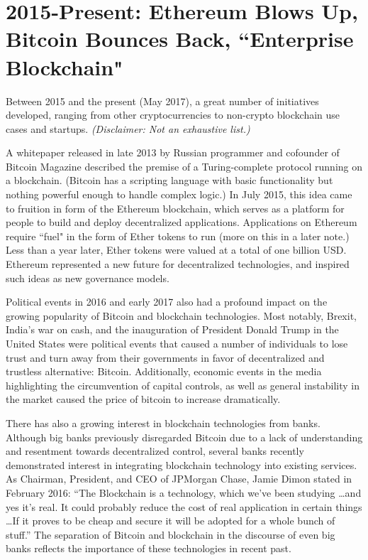 \documentclass[11pt]{article}
\begin{document}
    \section*{2015-Present: Ethereum Blows Up, Bitcoin Bounces Back, ``Enterprise Blockchain"}
    
    Between 2015 and the present (May 2017), a great number of initiatives developed, ranging from other cryptocurrencies to non-crypto blockchain use cases and startups. \textit{(Disclaimer: Not an exhaustive list.)}
    
    A whitepaper released in late 2013 by Russian programmer and cofounder of Bitcoin Magazine described the premise of a Turing-complete protocol running on a blockchain. (Bitcoin has a scripting language with basic functionality but nothing powerful enough to handle complex logic.) In July 2015, this idea came to fruition in form of the Ethereum blockchain, which serves as a platform for people to build and deploy decentralized applications. Applications on Ethereum require ``fuel" in the form of Ether tokens to run (more on this in a later note.) Less than a year later, Ether tokens were valued at a total of one billion USD. Ethereum represented a new future for decentralized technologies, and inspired such ideas as new governance models.
    
    Political events in 2016 and early 2017 also had a profound impact on the growing popularity of Bitcoin and blockchain technologies. Most notably, Brexit, India's war on cash, and the inauguration of President Donald Trump in the United States were political events that caused a number of individuals to lose trust and turn away from their governments in favor of decentralized and trustless alternative: Bitcoin. Additionally, economic events in the media highlighting the circumvention of capital controls, as well as general instability in the market caused the price of bitcoin to increase dramatically.
    
    There has also a growing interest in blockchain technologies from banks. Although big banks previously disregarded Bitcoin due to a lack of understanding and resentment towards decentralized control, several banks recently demonstrated interest in integrating blockchain technology into existing services. As Chairman, President, and CEO of JPMorgan Chase, Jamie Dimon stated in February 2016: ``The Blockchain is a technology, which we've been studying \ldots and yes it's real. It could probably reduce the cost of real application in certain things \ldots If it proves to be cheap and secure it will be adopted for a whole bunch of stuff.'' The separation of Bitcoin and blockchain in the discourse of even big banks reflects the importance of these technologies in recent past.
    
\end{document}

